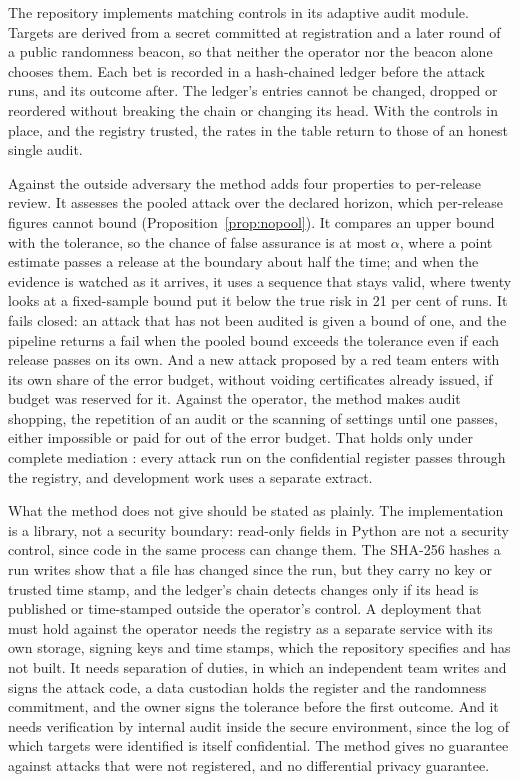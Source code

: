 The repository implements matching controls in its adaptive audit module. Targets are
derived from a secret committed at registration and a later round of a public
randomness beacon, so that neither the operator nor the beacon alone chooses them.
Each bet is recorded in a hash-chained ledger before the attack runs, and its outcome
after. The ledger's entries cannot be changed, dropped or reordered without breaking
the chain or changing its head. With the controls in place, and the registry trusted,
the rates in the table return to those of an honest single audit.

Against the outside adversary the method adds four properties to per-release review.
It assesses the pooled attack over the declared horizon, which per-release figures
cannot bound (Proposition~\ref{prop:nopool}). It compares an upper bound with the
tolerance, so the chance of false assurance is at most $\alpha$, where a point
estimate passes a release at the boundary about half the time; and when the evidence
is watched as it arrives, it uses a sequence that stays valid, where twenty looks at a
fixed-sample bound put it below the true risk in 21 per cent of runs.
It fails closed: an attack that has not been audited is given a bound of one, and the
pipeline returns a fail when the pooled bound exceeds the tolerance even if each
release passes on its own. And a new attack proposed by a red team enters with its
own share of the error budget, without voiding certificates already issued, if budget
was reserved for it. Against the operator, the method makes audit shopping, the
repetition of an audit or the scanning of settings until one passes, either impossible
or paid for out of the error budget. That holds only under complete mediation
\citep{saltzer1975}: every attack run on the confidential register passes through the
registry, and development work uses a separate extract.

What the method does not give should be stated as plainly. The implementation is a
library, not a security boundary: read-only fields in Python are not a security
control, since code in the same process can change them. The SHA-256 hashes a run
writes show that a file has changed since the run, but they carry no key or trusted
time stamp, and the ledger's chain detects changes only if its head is published or
time-stamped outside the operator's control. A deployment that must hold against the
operator needs the registry as a separate service with its own storage, signing keys
and time stamps, which the repository specifies and has not built.
It needs separation of duties, in which an independent team writes and signs the
attack code, a data custodian holds the register and the randomness commitment, and
the owner signs the tolerance before the first outcome. And it needs verification by
internal audit inside the secure environment, since the log of which targets were
identified is itself confidential. The method gives no guarantee against attacks that
were not registered, and no differential privacy guarantee.

